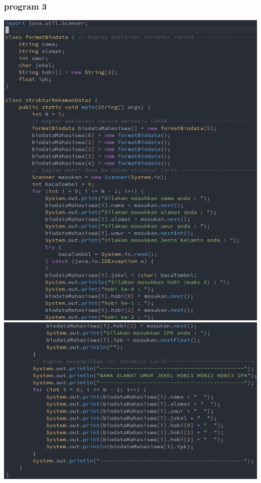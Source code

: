 \documentclass[a4paper,12pt]{article}
\begin{document}
\subsubsection{program 3}
\begin{center}
    \includegraphics[scale=.5]{code04.png} 
    \newpage
    \includegraphics[scale=.5]{code05.png} 
\end{center}
\end{document}
